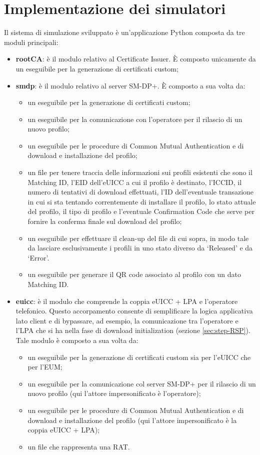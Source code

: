 \documentclass[10pt, oneside]{book}
\begin{document}
\section{Implementazione dei simulatori}
Il sistema di simulazione sviluppato è un'applicazione Python composta da tre moduli principali:
\begin{itemize}
\item \textbf{rootCA}: è il modulo relativo al Certificate Issuer. È composto unicamente da un eseguibile per la generazione di certificati custom;
\item \textbf{smdp}: è il modulo relativo al server SM-DP+. È composto a sua volta da:
\begin{itemize}
\item un eseguibile per la generazione di certificati custom;
\item un eseguibile per la comunicazione con l'operatore per il rilascio di un nuovo profilo;
\item un eseguibile per le procedure di Common Mutual Authentication e di download e installazione del profilo;
\item un file per tenere traccia delle informazioni sui profili esistenti che sono il Matching ID, l'EID dell'eUICC a cui il profilo è destinato, l'ICCID, il numero di tentativi di download effettuati, l'ID dell'eventuale transazione in cui si sta tentando correntemente di installare il profilo, lo stato attuale del profilo, il tipo di profilo e l'eventuale Confirmation Code che serve per fornire la conferma finale sul download del profilo;
\item un eseguibile per effettuare il clean-up del file di cui sopra, in modo tale da lasciare esclusivamente i profili in uno stato diverso da `Released' e da `Error'.
\item un eseguibile per generare il QR code associato al profilo con un dato Matching ID.
\end{itemize}
\item \textbf{euicc}: è il modulo che comprende la coppia eUICC + LPA e l'operatore telefonico. Questo accorpamento consente di semplificare la logica applicativa lato client e di bypassare, ad esempio, la comunicazione tra l'operatore e l'LPA che si ha nella fase di download initialization (sezione \ref{sec:step-RSP}). Tale modulo è composto a sua volta da:
\begin{itemize}
\item un eseguibile per la generazione di certificati custom sia per l'eUICC che per l'EUM;
\item un eseguibile per la comunicazione col server SM-DP+ per il rilascio di un nuovo profilo (qui l'attore impersonificato è l'operatore);
\item un eseguibile per le procedure di Common Mutual Authentication e di download e installazione del profilo (qui l'attore impersonificato è la coppia eUICC + LPA);
\item un file che rappresenta una RAT.
\end{itemize}
\end{itemize}
\end{document}
